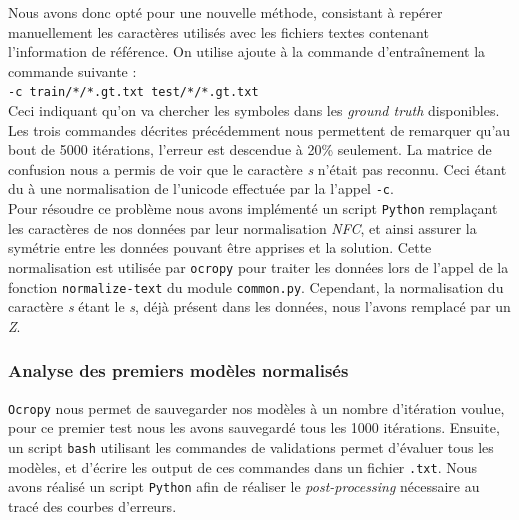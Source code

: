 \documentclass{article}
\newenvironment{oldstyle}{%
    \renewcommand\rmdefault{jkplvos}%
  \renewcommand\sfdefault{jkpssvos}%
  \renewcommand\ttdefault{jkpttvos}%
  \normalfont
}{}
\newcommand\s{\begin{oldstyle}s\end{oldstyle}}
\begin{document}
Nous avons donc opté pour une nouvelle méthode, consistant à repérer manuellement les caractères utilisés avec les fichiers textes contenant l'information de référence.
On utilise ajoute à la commande d'entraînement la commande suivante : \\
\texttt{-c train/*/*.gt.txt test/*/*.gt.txt} \\
Ceci indiquant qu'on va chercher les symboles dans les \textit{ground truth} disponibles.
Les trois commandes décrites précédemment nous permettent de remarquer qu'au bout de 5000 itérations, l'erreur est descendue à 20\% seulement. La matrice de confusion nous a permis de voir que le caractère \textit{\s} n'était pas reconnu. Ceci étant du à une normalisation de l'unicode effectuée par la l'appel \texttt{-c}. \\
Pour résoudre ce problème nous avons implémenté un script \texttt{Python} remplaçant les caractères de nos données par leur normalisation \textit{NFC}, et ainsi assurer la symétrie entre les données pouvant être apprises et la solution. Cette normalisation est utilisée par \texttt{ocropy} pour traiter les données lors de l'appel de la fonction \texttt{normalize-text} du module \texttt{common.py}. Cependant, la normalisation du caractère \textit{\s} étant le \textit{s}, déjà présent dans les données, nous l'avons remplacé par un \textit{Z}.

\subsubsection{Analyse des premiers modèles normalisés}

\texttt{Ocropy} nous permet de sauvegarder nos modèles à un nombre d'itération voulue, pour ce premier test nous les avons sauvegardé tous les 1000 itérations. Ensuite, un script \texttt{bash} utilisant les commandes de validations permet d'évaluer tous les modèles, et d'écrire les output de ces commandes dans un fichier \texttt{.txt}. Nous avons réalisé un script \texttt{Python} afin de réaliser le \textit{post-processing} nécessaire au tracé des courbes d'erreurs.
\end{document}
